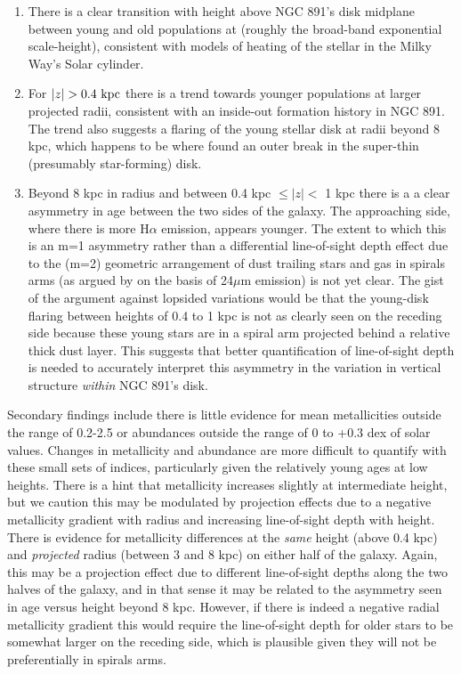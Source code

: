 \begin{enumerate}
  \item There is a clear transition with height above NGC 891's disk
    midplane between young and old populations at 
    (roughly the broad-band exponential scale-height), consistent with
    models of heating of the stellar in the Milky Way's Solar
    cylinder.

  \item For $|z| > 0.4~\mathrm{kpc} $ there is a trend towards younger
    populations at larger projected radii, consistent with an
    inside-out formation history in NGC 891. The trend also suggests a
    flaring of the young stellar disk at radii beyond 8 kpc, which
    happens to be where \citet{Schechtman-Rook13} found an outer break
    in the super-thin (presumably star-forming) disk.

  \item Beyond 8 kpc in radius and between 0.4 kpc $\leq |z| <$ 1 kpc
    there is a a clear asymmetry in age between the two sides of the
    galaxy. The approaching side, where there is more H$\alpha$
    emission, appears younger. The extent to which this is an m=1
    asymmetry rather than a differential line-of-sight depth effect
    due to the (m=2) geometric arrangement of dust trailing stars and
    gas in spirals arms (as argued by \citet{Kamphuis07b} on the basis
    of 24$\mu$m emission) is not yet clear.  The gist of the argument
    against lopsided variations would be that the young-disk flaring
    between heights of 0.4 to 1 kpc is not as clearly seen on the
    receding side because these young stars are in a spiral arm
    projected behind a relative thick dust layer.  This suggests that
    better quantification of line-of-sight depth is needed to
    accurately interpret this asymmetry in the variation in vertical
    structure {\it within} NGC 891's disk.

\end{enumerate}

Secondary findings include there is little evidence for mean
metallicities outside the range of 0.2-2.5 \Zsol or abundances
outside the range of 0 to +0.3 dex of solar values. Changes in
metallicity and abundance are more difficult to quantify with these
small sets of indices, particularly given the relatively young ages at
low heights. There is a hint that metallicity increases slightly at
intermediate height, but we caution this may be modulated by
projection effects due to a negative metallicity gradient with radius
and increasing line-of-sight depth with height. There is evidence for
metallicity differences at the {\it same} height (above 0.4 kpc) and
{\it projected} radius (between 3 and 8 kpc) on either half of the
galaxy. Again, this may be a projection effect due to different
line-of-sight depths along the two halves of the galaxy, and in that
sense it may be related to the asymmetry seen in age versus height
beyond 8 kpc. However, if there is indeed a negative radial
metallicity gradient this would require the line-of-sight depth for
older stars to be somewhat larger on the receding side, which is
plausible given they will not be preferentially in spirals arms.

